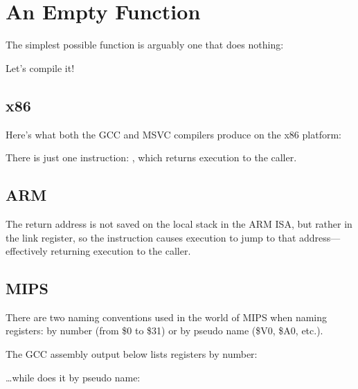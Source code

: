\section{An Empty Function}
\label{empty_func}

The simplest possible function is arguably one that does nothing:



Let's compile it!

\subsection{x86}

Here's what both the GCC and MSVC compilers produce on the x86 platform:



There is just one instruction: \RET, which returns execution to the \gls{caller}.

\subsection{ARM}



The return address is not saved on the local stack in the ARM \ac{ISA}, but rather in the link register, 
so the  instruction causes execution to jump to that address---effectively returning execution
to the \gls{caller}.

\subsection{MIPS}

There are two naming conventions used in the world of MIPS when naming registers:
by number (from \$0 to \$31) or by pseudo name (\$V0, \$A0, etc.).

The GCC assembly output below lists registers by number:



\dots while \IDA does it by pseudo name:



